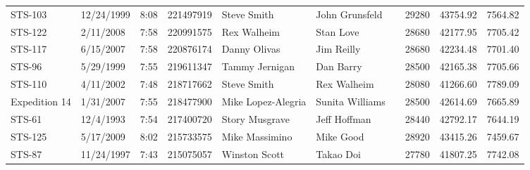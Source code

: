 \documentclass[sigconf]{acmart}
\begin{document}
\begin{table}[htb]
{\begin{tabular}{llllllllll}
		STS-103          & 12/24/1999    & 8:08              & 221497919                              & Steve Smith        & John Grunsfeld       &                 & 29280                                 & 43754.92                   & 7564.82                   \\
		STS-122          & 2/11/2008     & 7:58              & 220991575                              & Rex Walheim        & Stan Love            &                 & 28680                                 & 42177.95                   & 7705.42                   \\
		STS-117          & 6/15/2007     & 7:58              & 220876174                              & Danny Olivas       & Jim Reilly           &                 & 28680                                 & 42234.48                   & 7701.40                   \\
		STS-96           & 5/29/1999     & 7:55              & 219611347                              & Tammy Jernigan     & Dan Barry            &                 & 28500                                 & 42165.38                   & 7705.66                   \\
		STS-110          & 4/11/2002     & 7:48              & 218717662                              & Steve Smith        & Rex Walheim          &                 & 28080                                 & 41266.60                   & 7789.09                   \\
		Expedition 14    & 1/31/2007     & 7:55              & 218477900                              & Mike Lopez-Alegria & Sunita Williams      &                 & 28500                                 & 42614.69                   & 7665.89                   \\
		STS-61           & 12/4/1993     & 7:54              & 217400720                              & Story Musgrave     & Jeff Hoffman         &                 & 28440                                 & 42792.17                   & 7644.19                   \\
		STS-125          & 5/17/2009     & 8:02              & 215733575                              & Mike Massimino     & Mike Good            &                 & 28920                                 & 43415.26                   & 7459.67                   \\
		STS-87           & 11/24/1997    & 7:43              & 215075057                              & Winston Scott      & Takao Doi            &                 & 27780                                 & 41807.25                   & 7742.08                   \\

\end{tabular}}
\end{table}
\end{document}
